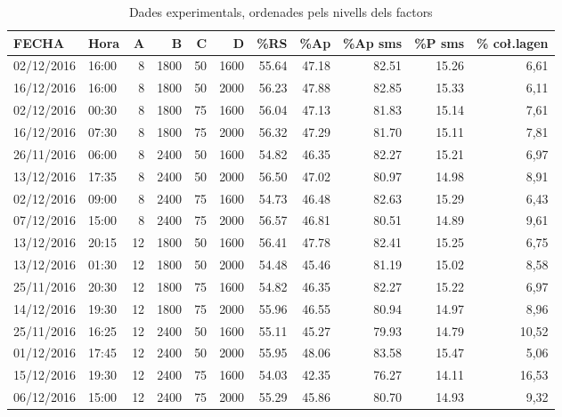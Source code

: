 \documentclass[a4paper]{article}
\begin{document}
\begin{table}[H]
	\centering
	\begin{tabular}{ l | l | r | r | r | r | r | r | r | r | r }
		\rowcolor{gray!50}
		FECHA & Hora & A & B & C & D & \%RS & \%Ap & \%Ap sms & \%P sms & \% co\l.lagen \\ \hline
		02/12/2016 & 16:00 & 8 & 1800 & 50 & 1600 & 55.64 & 47.18 & 82.51 & 15.26 & 6,61 \\ 
		16/12/2016 & 16:00 & 8 & 1800 & 50 & 2000 & 56.23 & 47.88 & 82.85 & 15.33 & 6,11 \\ 
		02/12/2016 & 00:30 & 8 & 1800 & 75 & 1600 & 56.04 & 47.13 & 81.83 & 15.14 & 7,61 \\ 
		16/12/2016 & 07:30 & 8 & 1800 & 75 & 2000 & 56.32 & 47.29 & 81.70 & 15.11 & 7,81 \\ 
		26/11/2016 & 06:00 & 8 & 2400 & 50 & 1600 & 54.82 & 46.35 & 82.27 & 15.21 & 6,97 \\ 
		13/12/2016 & 17:35 & 8 & 2400 & 50 & 2000 & 56.50 & 47.02 & 80.97 & 14.98 & 8,91 \\ 
		02/12/2016 & 09:00 & 8 & 2400 & 75 & 1600 & 54.73 & 46.48 & 82.63 & 15.29 & 6,43 \\ 
		07/12/2016 & 15:00 & 8 & 2400 & 75 & 2000 & 56.57 & 46.81 & 80.51 & 14.89 & 9,61 \\ 
		13/12/2016 & 20:15 & 12 & 1800 & 50 & 1600 & 56.41 & 47.78 & 82.41 & 15.25 & 6,75 \\ 
		13/12/2016 & 01:30 & 12 & 1800 & 50 & 2000 & 54.48 & 45.46 & 81.19 & 15.02 & 8,58 \\ 
		25/11/2016 & 20:30 & 12 & 1800 & 75 & 1600 & 54.82 & 46.35 & 82.27 & 15.22 & 6,97 \\ 
		14/12/2016 & 19:30 & 12 & 1800 & 75 & 2000 & 55.96 & 46.55 & 80.94 & 14.97 & 8,96 \\ 
		25/11/2016 & 16:25 & 12 & 2400 & 50 & 1600 & 55.11 & 45.27 & 79.93 & 14.79 & 10,52 \\ 
		01/12/2016 & 17:45 & 12 & 2400 & 50 & 2000 & 55.95 & 48.06 & 83.58 & 15.47 & 5,06 \\ 
		15/12/2016 & 19:30 & 12 & 2400 & 75 & 1600 & 54.03 & 42.35 & 76.27 & 14.11 & 16,53 \\ 
		06/12/2016 & 15:00 & 12 & 2400 & 75 & 2000 & 55.29 & 45.86 & 80.70 & 14.93 & 9,32 \\ 
	\end{tabular}
	\caption{Dades experimentals, ordenades pels nivells dels factors}
	\label{tab:resultats}
\end{table}
\end{document}

